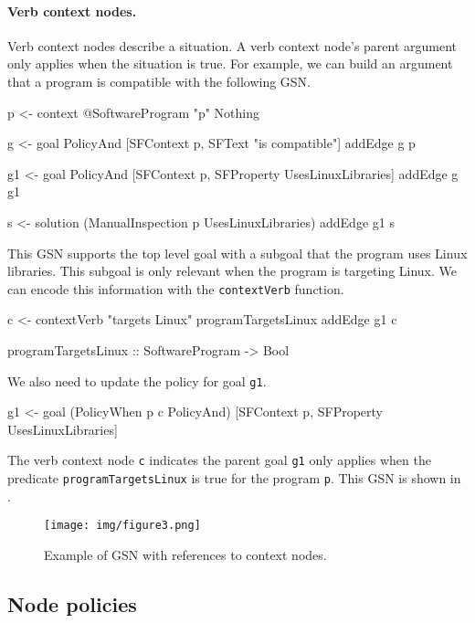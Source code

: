 \documentclass{article}
\begin{document}
\paragraph{Verb context nodes.}
Verb context nodes describe a situation. 
A verb context node's parent argument only applies when the situation is true. 
For example, we can build an argument that a program is compatible with the following GSN. 
\begin{mcode}
p <- context @SoftwareProgram "p" Nothing

g <- goal PolicyAnd [SFContext p, SFText "is compatible"]
addEdge g p

g1 <- goal PolicyAnd [SFContext p, SFProperty UsesLinuxLibraries]
addEdge g g1

s <- solution (ManualInspection p UsesLinuxLibraries)
addEdge g1 s
\end{mcode}
This GSN supports the top level goal with a subgoal that the program uses Linux libraries. 
This subgoal is only relevant when the program is targeting Linux. 
We can encode this information with the \texttt{contextVerb} function. 
\begin{mcode}
c <- contextVerb "targets Linux" programTargetsLinux
addEdge g1 c

programTargetsLinux :: SoftwareProgram -> Bool
\end{mcode}
We also need to update the policy for goal \texttt{g1}. 
\begin{mcode}
g1 <- goal (PolicyWhen p c PolicyAnd) [SFContext p, SFProperty UsesLinuxLibraries]
\end{mcode}
The verb context node \texttt{c} indicates the parent goal \texttt{g1} only applies when the predicate \texttt{programTargetsLinux} is true for the program \texttt{p}.
This GSN is shown in . 


\begin{figure}
\centering
\texttt{[image: img/figure3.png]}
\caption{Example of GSN with references to context nodes.}
\label{fig:fig3}
\end{figure}

\subsection{Node policies}
\label{sec:policies}
\end{document}
